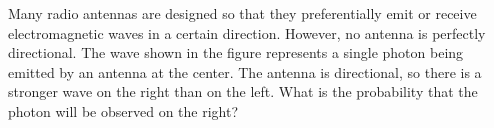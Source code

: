 Many radio antennas are designed so that they preferentially emit or receive
electromagnetic waves in a certain direction. However, no antenna is perfectly
directional.
The wave shown in the figure represents a single photon being emitted by
an antenna at the center. The antenna is directional, so there is a stronger
wave on
the right than on the left. What is the probability that the photon will be
observed on the right?
